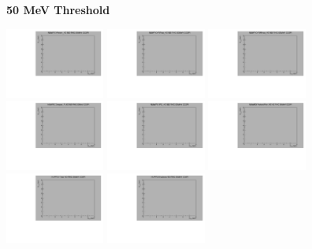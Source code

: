 \textbf{50 MeV Threshold}

\begin{center}

  \includegraphics[width=0.245\textwidth]{plots/response_matrix/Proton_KE_RHC_CC0Pi_50MeV.pdf}
  \includegraphics[width=0.245\textwidth]{plots/response_matrix/PiPlus_KE_RHC_CC0Pi_50MeV.pdf}
  \includegraphics[width=0.245\textwidth]{plots/response_matrix/PiMinus_KE_RHC_CC0Pi_50MeV.pdf}
  \includegraphics[width=0.245\textwidth]{plots/response_matrix/Charged_Pi_KE_RHC_CC0Pi_50MeV.pdf}
  \includegraphics[width=0.245\textwidth]{plots/response_matrix/Pi0_KE_RHC_CC0Pi_50MeV.pdf}
  \includegraphics[width=0.245\textwidth]{plots/response_matrix/Proton+Pion_KE_RHC_CC0Pi_50MeV.pdf}
  \includegraphics[width=0.245\textwidth]{plots/response_matrix/Total_RHC_CC0Pi_50MeV.pdf}
  \includegraphics[width=0.245\textwidth]{plots/response_matrix/Hadrons_RHC_CC0Pi_50MeV.pdf}

\end{center}

